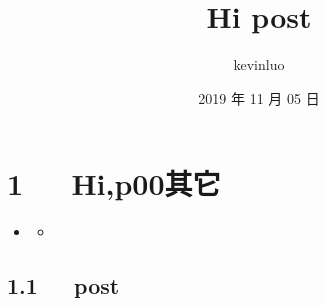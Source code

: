 \documentclass[letterpaper,10pt,english]{sphinxmanual}
\title{Hi post}
\date{2019 年 11 月 05 日}
\author{kevinluo}
\begin{document}
\pagestyle{empty}
\sphinxmaketitle
\pagestyle{plain}
\sphinxtableofcontents
\pagestyle{normal}
\label{\detokenize{index::doc}}



\chapter{1   Hi,p00其它}
\label{\detokenize{p00_u5176_u5b83/Hello_uff0cp00_u5176_u5b83:hi-p00}}\label{\detokenize{p00_u5176_u5b83/Hello_uff0cp00_u5176_u5b83::doc}}
\begin{sphinxShadowBox}
\begin{itemize}
\item {} 
\label{\detokenize{p00_u5176_u5b83/Hello_uff0cp00_u5176_u5b83:id2}}{\hyperref[\detokenize{p00_u5176_u5b83/Hello_uff0cp00_u5176_u5b83:hi-p00}]{}}
\begin{itemize}
\item {} 
\label{\detokenize{p00_u5176_u5b83/Hello_uff0cp00_u5176_u5b83:id3}}{\hyperref[\detokenize{p00_u5176_u5b83/Hello_uff0cp00_u5176_u5b83:post}]{}}

\end{itemize}

\end{itemize}
\end{sphinxShadowBox}


\section{1.1   post}
\label{\detokenize{p00_u5176_u5b83/Hello_uff0cp00_u5176_u5b83:post}}
\end{document}

